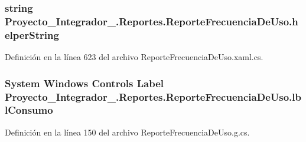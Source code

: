 \hypertarget{class_proyecto___integrador__3_1_1_reportes_1_1_reporte_frecuencia_de_uso_a445e3fd272881069a4fb7c71982c185b}{
\subsubsection[{helper\-String}]{\setlength{\rightskip}{0pt plus 5cm}string Proyecto\-\_\-\-Integrador\-\_.\-Reportes.\-Reporte\-Frecuencia\-De\-Uso.\-helper\-String\hspace{0.3cm}{\ttfamily [private]}}}\label{class_proyecto___integrador__3_1_1_reportes_1_1_reporte_frecuencia_de_uso_a445e3fd272881069a4fb7c71982c185b}


Definición en la línea 623 del archivo Reporte\-Frecuencia\-De\-Uso.\-xaml.\-cs.

\hypertarget{class_proyecto___integrador__3_1_1_reportes_1_1_reporte_frecuencia_de_uso_aad6d42ec1def08d2c9851f5952be9428}{
\subsubsection[{lbl\-Consumo}]{\setlength{\rightskip}{0pt plus 5cm}System Windows Controls Label Proyecto\-\_\-\-Integrador\-\_.\-Reportes.\-Reporte\-Frecuencia\-De\-Uso.\-lbl\-Consumo\hspace{0.3cm}{\ttfamily [package]}}}\label{class_proyecto___integrador__3_1_1_reportes_1_1_reporte_frecuencia_de_uso_aad6d42ec1def08d2c9851f5952be9428}


Definición en la línea 150 del archivo Reporte\-Frecuencia\-De\-Uso.\-g.\-cs.

